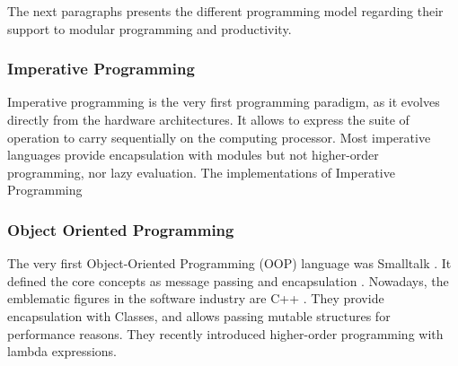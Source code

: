 
The next paragraphs presents the different programming model regarding their support to modular programming and productivity.

\subsubsection{Imperative Programming}

Imperative programming is the very first programming paradigm, as it evolves directly from the hardware architectures.
It allows to express the suite of operation to carry sequentially on the computing processor.
Most imperative languages provide encapsulation with modules but not higher-order programming, nor lazy evaluation.
The implementations of Imperative Programming 

\subsubsection{Object Oriented Programming}



The very first Object-Oriented Programming (OOP) language was Smalltalk \cite{Goldberg1984}.
It defined the core concepts as message passing and encapsulation %
.
Nowadays, the emblematic figures in the software industry are C++ .
They provide encapsulation with Classes, and allows passing mutable structures for performance reasons.
They recently introduced higher-order programming with lambda expressions.

